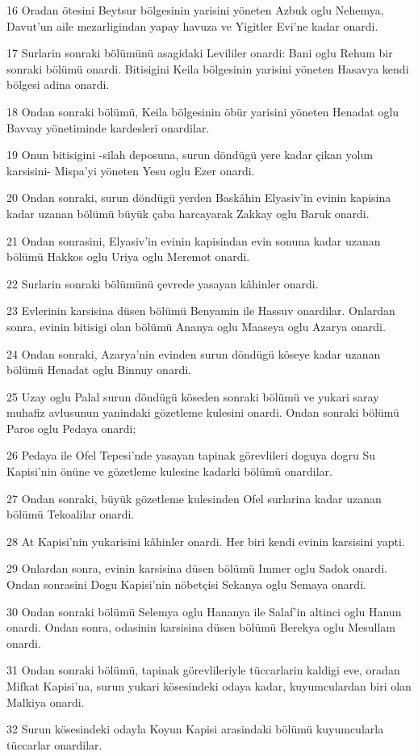 \par 16 Oradan ötesini Beytsur bölgesinin yarisini yöneten Azbuk oglu Nehemya, Davut'un aile mezarligindan yapay havuza ve Yigitler Evi'ne kadar onardi.
\par 17 Surlarin sonraki bölümünü asagidaki Levililer onardi: Bani oglu Rehum bir sonraki bölümü onardi. Bitisigini Keila bölgesinin yarisini yöneten Hasavya kendi bölgesi adina onardi.
\par 18 Ondan sonraki bölümü, Keila bölgesinin öbür yarisini yöneten Henadat oglu Bavvay yönetiminde kardesleri onardilar.
\par 19 Onun bitisigini -silah deposuna, surun döndügü yere kadar çikan yolun karsisini- Mispa'yi yöneten Yesu oglu Ezer onardi.
\par 20 Ondan sonraki, surun döndügü yerden Baskâhin Elyasiv'in evinin kapisina kadar uzanan bölümü büyük çaba harcayarak Zakkay oglu Baruk onardi.
\par 21 Ondan sonrasini, Elyasiv'in evinin kapisindan evin sonuna kadar uzanan bölümü Hakkos oglu Uriya oglu Meremot onardi.
\par 22 Surlarin sonraki bölümünü çevrede yasayan kâhinler onardi.
\par 23 Evlerinin karsisina düsen bölümü Benyamin ile Hassuv onardilar. Onlardan sonra, evinin bitisigi olan bölümü Ananya oglu Maaseya oglu Azarya onardi.
\par 24 Ondan sonraki, Azarya'nin evinden surun döndügü köseye kadar uzanan bölümü Henadat oglu Binnuy onardi.
\par 25 Uzay oglu Palal surun döndügü köseden sonraki bölümü ve yukari saray muhafiz avlusunun yanindaki gözetleme kulesini onardi. Ondan sonraki bölümü Paros oglu Pedaya onardi;
\par 26 Pedaya ile Ofel Tepesi'nde yasayan tapinak görevlileri doguya dogru Su Kapisi'nin önüne ve gözetleme kulesine kadarki bölümü onardilar.
\par 27 Ondan sonraki, büyük gözetleme kulesinden Ofel surlarina kadar uzanan bölümü Tekoalilar onardi.
\par 28 At Kapisi'nin yukarisini kâhinler onardi. Her biri kendi evinin karsisini yapti.
\par 29 Onlardan sonra, evinin karsisina düsen bölümü Immer oglu Sadok onardi. Ondan sonrasini Dogu Kapisi'nin nöbetçisi Sekanya oglu Semaya onardi.
\par 30 Ondan sonraki bölümü Selemya oglu Hananya ile Salaf'in altinci oglu Hanun onardi. Ondan sonra, odasinin karsisina düsen bölümü Berekya oglu Mesullam onardi.
\par 31 Ondan sonraki bölümü, tapinak görevlileriyle tüccarlarin kaldigi eve, oradan Mifkat Kapisi'na, surun yukari kösesindeki odaya kadar, kuyumculardan biri olan Malkiya onardi.
\par 32 Surun kösesindeki odayla Koyun Kapisi arasindaki bölümü kuyumcularla tüccarlar onardilar.

